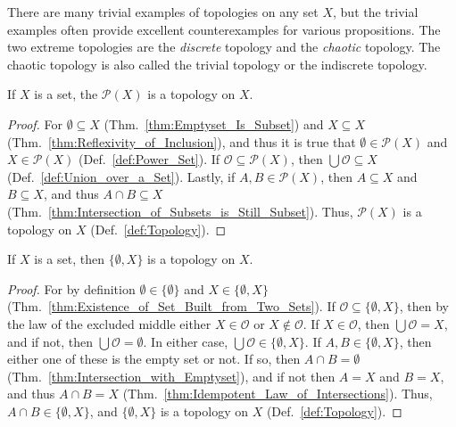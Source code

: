     There are many trivial examples of topologies on any set $X$, but the
    trivial examples often provide excellent counterexamples for various
    propositions. The two extreme topologies are the \textit{discrete} topology
    and the \textit{chaotic} topology. The chaotic topology is also called the
    trivial topology or the indiscrete topology.
    \begin{theorem}
        \label{thm:discrete_topology_is_a_topology}%
        If $X$ is a set, the $\mathcal{P}(X)$ is a topology on $X$.
    \end{theorem}
    \begin{proof}
        For $\emptyset\subseteq{X}$ (Thm.~\ref{thm:Emptyset_Is_Subset}) and
        $X\subseteq{X}$ (Thm.~\ref{thm:Reflexivity_of_Inclusion}), and thus it
        is true that $\emptyset\in\mathcal{P}(X)$ and $X\in\mathcal{P}(X)$
        (Def.~\ref{def:Power_Set}). If $\mathcal{O}\subseteq\mathcal{P}(X)$,
        then $\bigcup\mathcal{O}\subseteq{X}$ (Def.~\ref{def:Union_over_a_Set}).
        Lastly, if $A,B\in\mathcal{P}(X)$, then $A\subseteq{X}$ and
        $B\subseteq{X}$, and thus $A\cap{B}\subseteq{X}$
        (Thm.~\ref{thm:Intersection_of_Subsets_is_Still_Subset}). Thus,
        $\mathcal{P}(X)$ is a topology on $X$ (Def.~\ref{def:Topology}).
    \end{proof}
    \begin{theorem}
        \label{thm:chaotic_topology_is_topology}%
        If $X$ is a set, then $\{\emptyset,X\}$ is a topology on $X$.
    \end{theorem}
    \begin{proof}
        For by definition $\emptyset\in\{\emptyset\}$ and $X\in\{\emptyset,X\}$
        (Thm.~\ref{thm:Existence_of_Set_Built_from_Two_Sets}). If
        $\mathcal{O}\subseteq\{\emptyset,X\}$, then by the law of the excluded
        middle either $X\in\mathcal{O}$ or $X\notin\mathcal{O}$. If
        $X\in\mathcal{O}$, then $\bigcup\mathcal{O}=X$, and if not, then
        $\bigcup\mathcal{O}=\emptyset$. In either case,
        $\bigcup\mathcal{O}\in\{\emptyset,X\}$. If $A,B\in\{\emptyset,X\}$, then
        either one of these is the empty set or not. If so, then
        $A\cap{B}=\emptyset$ (Thm.~\ref{thm:Intersection_with_Emptyset}), and
        if not then $A=X$ and $B=X$, and thus $A\cap{B}=X$
        (Thm.~\ref{thm:Idempotent_Law_of_Intersections}). Thus,
        $A\cap{B}\in\{\emptyset,X\}$, and $\{\emptyset,X\}$ is a topology on $X$
        (Def.~\ref{def:Topology}).
    \end{proof}
